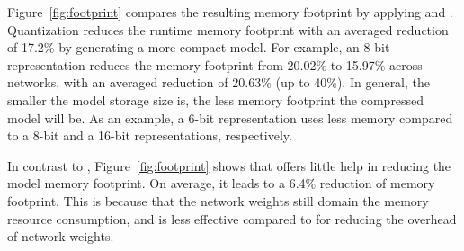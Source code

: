 Figure~\ref{fig:footprint} compares the resulting memory footprint by applying \quantization and \pruning. Quantization reduces the runtime
memory footprint with an averaged reduction of 17.2\% by generating a more compact model. For example, an 8-bit representation reduces the
memory footprint from 20.02\% to 15.97\% across networks, with an averaged reduction of 20.63\% (up to 40\%). In general, the smaller the
model storage size is, the less memory footprint the compressed model will be. As an example, a 6-bit representation uses  less memory compared to a 8-bit and a 16-bit representations, respectively.

In contrast to \dquantization, Figure~\ref{fig:footprint} shows that  \pruning offers little help in reducing the model memory footprint.
On average, it leads to a 6.4\% reduction of memory footprint. This is because that the network weights still domain the memory resource
consumption, and \pruning is less effective compared to \dquantization for reducing the overhead of network weights. 
